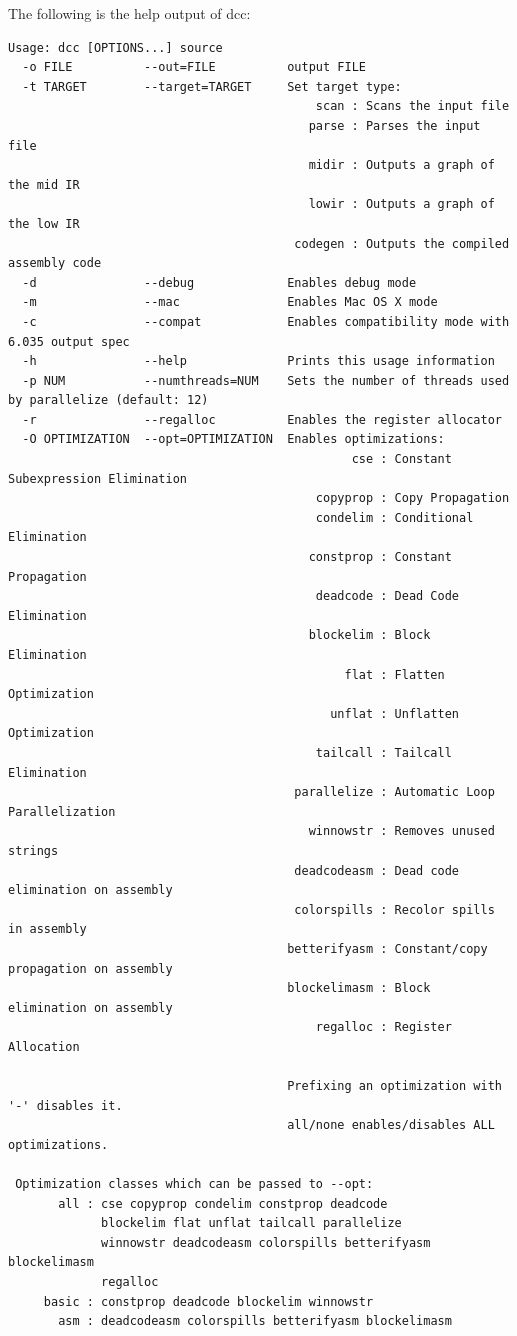 \documentclass[11pt]{article}
\begin{document}
The following is the help output of dcc:
\begin{verbatim}
Usage: dcc [OPTIONS...] source
  -o FILE          --out=FILE          output FILE
  -t TARGET        --target=TARGET     Set target type:
										   scan : Scans the input file
										  parse : Parses the input file
										  midir : Outputs a graph of the mid IR
										  lowir : Outputs a graph of the low IR
										codegen : Outputs the compiled assembly code
  -d               --debug             Enables debug mode
  -m               --mac               Enables Mac OS X mode
  -c               --compat            Enables compatibility mode with 6.035 output spec
  -h               --help              Prints this usage information
  -p NUM           --numthreads=NUM    Sets the number of threads used by parallelize (default: 12)
  -r               --regalloc          Enables the register allocator
  -O OPTIMIZATION  --opt=OPTIMIZATION  Enables optimizations:
                                                cse : Constant Subexpression Elimination
                                           copyprop : Copy Propagation
                                           condelim : Conditional Elimination
                                          constprop : Constant Propagation
                                           deadcode : Dead Code Elimination
                                          blockelim : Block Elimination
                                               flat : Flatten Optimization
                                             unflat : Unflatten Optimization
                                           tailcall : Tailcall Elimination
                                        parallelize : Automatic Loop Parallelization
                                          winnowstr : Removes unused strings
                                        deadcodeasm : Dead code elimination on assembly
                                        colorspills : Recolor spills in assembly
                                       betterifyasm : Constant/copy propagation on assembly
                                       blockelimasm : Block elimination on assembly
                                           regalloc : Register Allocation
                                       
                                       Prefixing an optimization with '-' disables it.
                                       all/none enables/disables ALL optimizations.

 Optimization classes which can be passed to --opt:
       all : cse copyprop condelim constprop deadcode
             blockelim flat unflat tailcall parallelize
             winnowstr deadcodeasm colorspills betterifyasm blockelimasm
             regalloc
     basic : constprop deadcode blockelim winnowstr
       asm : deadcodeasm colorspills betterifyasm blockelimasm
\end{verbatim}
\end{document}
